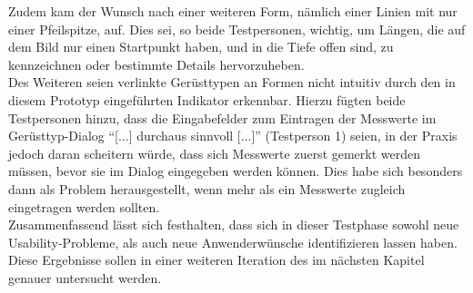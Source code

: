 Zudem kam der Wunsch nach einer weiteren Form, nämlich einer Linien mit nur einer Pfeilspitze, auf.
Dies sei, so beide Testpersonen, wichtig, um Längen, die auf dem Bild nur einen Startpunkt haben, und in die Tiefe offen sind, zu kennzeichnen oder bestimmte Details hervorzuheben. \\

Des Weiteren seien verlinkte Gerüsttypen an Formen nicht intuitiv durch den in diesem Prototyp eingeführten Indikator erkennbar.
Hierzu fügten beide Testpersonen hinzu, dass die Eingabefelder zum Eintragen der Messwerte im Gerüsttyp-Dialog ``[...] durchaus sinnvoll [...]'' (Testperson 1) seien, in der Praxis jedoch daran scheitern würde, dass sich Messwerte zuerst gemerkt werden müssen, bevor sie im Dialog eingegeben werden können.
Dies habe sich besonders dann als Problem herausgestellt, wenn mehr als ein Messwerte zugleich eingetragen werden sollten. \\

Zusammenfassend lässt sich festhalten, dass sich in dieser Testphase sowohl neue Usability-Probleme, als auch neue Anwenderwünsche identifizieren lassen haben.
Diese Ergebnisse sollen in einer weiteren Iteration des \hcdp{} im nächsten Kapitel genauer untersucht werden.
